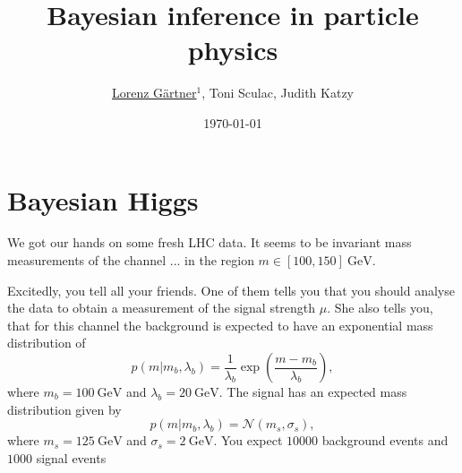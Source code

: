 \documentclass{article}
\title{Bayesian inference in particle physics}
\author{\underline{Lorenz G\"artner}$^{1}$, Toni Sculac, Judith Katzy }
\date{\today}
\begin{document}
\maketitle


\section{Bayesian Higgs}
We got our hands on some fresh LHC data. It seems to be invariant mass measurements of the channel ... in the region $m \in [100, 150]~\mathrm{GeV}$.

Excitedly, you tell all your friends. One of them tells you that you should analyse the data to obtain a measurement of the signal strength $\mu$. She also tells you, that for this channel the background is expected to have an exponential mass distribution of
$$p(m|m_b, \lambda_b) =\frac{1}{\lambda_b} \exp\left(\frac{m-m_b}{\lambda_b}\right),$$
where $m_b=100~\mathrm{GeV}$ and  $\lambda_b=20~\mathrm{GeV}$. The signal has an expected mass distribution given by
$$p(m|m_b, \lambda_b) = \mathcal{N}(m_s, \sigma_s),$$
where $m_s=125~\mathrm{GeV}$ and $\sigma_s=2~\mathrm{GeV}$. You expect $10000$ background events and $1000$ signal events
\end{document}
